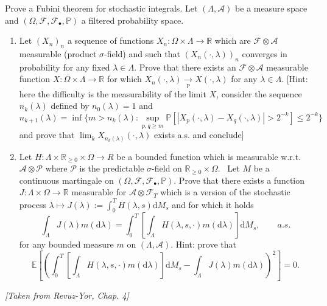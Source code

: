 \documentclass{article}
\newcommand{\assign}{:=}
\newcommand{\mathd}{\mathrm{d}}
\newcommand{\tmtextit}[1]{{\itshape{#1}}}
\newenvironment{enumeratealpha}{\begin{enumerate}[a{\textup{)}}] }{\end{enumerate}}
{\theorembodyfont{\rmfamily\small}\newtheorem{exercise}{Exercise}}
\begin{document}
\begin{exercise}
  [Pts 3+3] Prove a Fubini theorem for stochastic integrals. Let $(\Lambda,
  \mathcal{A})$ be a measure space and $(\Omega, \mathcal{F},
  \mathcal{F}_{\bullet}, \mathbb{P})$ a filtered probability space.
  \begin{enumeratealpha}
    \item Let $(X_n)_n$ a sequence of functions $X_n : \Omega \times \Lambda
    \rightarrow \mathbb{R}$ which are $\mathcal{F} \otimes \mathcal{A}$
    measurable (product $\sigma$-field) and such that $(X_n (\cdot,
    \lambda))_n$ converges in probability for any fixed $\lambda \in \Lambda$.
    Prove that there exists an $\mathcal{F} \otimes \mathcal{A}$ measurable
    function $X : \Omega \times \Lambda \rightarrow \mathbb{R}$ for which $X_n
    (\cdot, \lambda) \xrightarrow[\mathbb{P}]{} X (\cdot, \lambda)$ for any
    $\lambda \in \Lambda$. [Hint: here the difficulty is the measurability of
    the limit $X$, consider the sequence $n_k (\lambda)$ defined by $n_0
    (\lambda) = 1$ and
    \[ n_{k + 1} (\lambda) = \inf \{ m > n_k (\lambda) : \sup_{p, q \geqslant
       m} \mathbb{P} [| X_p (\cdot, \lambda) - X_q (\cdot, \lambda) | > 2^{-
       k}] \leqslant 2^{- k} \} \]
    and prove that $\lim_k X_{n_k (\lambda)} (\cdot, \lambda)$ exists a.s. and
    conclude]
    
    \item Let $H : \Lambda \times \mathbb{R}_{\geqslant 0} \times \Omega
    \rightarrow R$ be a bounded function which is measurable w.r.t.
    $\mathcal{A} \otimes \mathcal{P}$ where $\mathcal{P}$ is the predictable
    $\sigma$-field on $\mathbb{R}_{\geqslant 0} \times \Omega$. \ Let $M$ be a
    continuous martingale on $(\Omega, \mathcal{F}, \mathcal{F}_{\bullet},
    \mathbb{P})$. Prove that there exists a function $J : \Lambda \times
    \Omega \rightarrow \mathbb{R}$ measurable for $\mathcal{A} \otimes
    \mathcal{F}_T$ which is a version of the stochastic process $\lambda
    \mapsto J (\lambda) \assign \int_0^T H (\lambda, s) \mathd M_s$ and for
    which it holds
    \[ \int_{\Lambda} J (\lambda) m (\mathd \lambda) = \int_0^T \left[
       \int_{\Lambda} H (\lambda, s, \cdot) m (\mathd \lambda)  \right] \mathd
       M_s, \qquad a.s. \]
    for any bounded measure $m$ on $(\Lambda, \mathcal{A})$. Hint: prove that
    \[ \mathbb{E} \left[ \left( \int_0^T \left[ \int_{\Lambda} H (\lambda, s,
       \cdot) m (\mathd \lambda)  \right] \mathd M_s - \int_{\Lambda} J
       (\lambda) m (\mathd \lambda) \right)^2 \right] = 0. \]
    
  \end{enumeratealpha}
  \tmtextit{[Taken from Revuz-Yor, Chap. 4]}
\end{exercise}

\hrulefill

\
\end{document}
